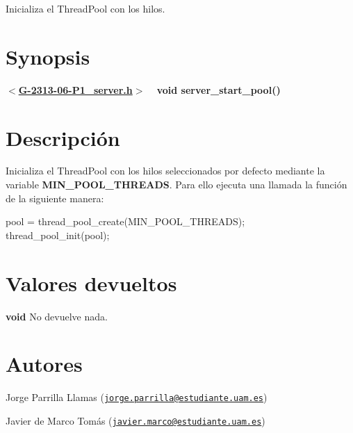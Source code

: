 Inicializa el Thread\+Pool con los hilos.\hypertarget{server_start_pool_Synopsis}{}\section{Synopsis}\label{server_start_pool_Synopsis}
{ {\bfseries $<$\hyperlink{G-2313-06-P1__server_8h_source}{G-\/2313-\/06-\/\+P1\+\_\+server.\+h}$>$} ~\newline
 {\bfseries void server\+\_\+start\+\_\+pool()} } \hypertarget{server_start_pool_descripcion}{}\section{Descripción}\label{server_start_pool_descripcion}
Inicializa el Thread\+Pool con los hilos seleccionados por defecto mediante la variable {\bfseries M\+I\+N\+\_\+\+P\+O\+O\+L\+\_\+\+T\+H\+R\+E\+A\+D\+S}. Para ello ejecuta una llamada la función de la siguiente manera\+:

{\ttfamily  pool = thread\+\_\+pool\+\_\+create(\+M\+I\+N\+\_\+\+P\+O\+O\+L\+\_\+\+T\+H\+R\+E\+A\+D\+S); ~\newline
thread\+\_\+pool\+\_\+init(pool); } \hypertarget{server_start_pool_return}{}\section{Valores devueltos}\label{server_start_pool_return}

\begin{DoxyItemize}
\item {\bfseries void} No devuelve nada. 
\end{DoxyItemize}\hypertarget{server_start_pool_authors}{}\section{Autores}\label{server_start_pool_authors}

\begin{DoxyItemize}
\item Jorge Parrilla Llamas (\href{mailto:jorge.parrilla@estudiante.uam.es}{\tt jorge.\+parrilla@estudiante.\+uam.\+es}) 
\item Javier de Marco Tomás (\href{mailto:javier.marco@estudiante.uam.es}{\tt javier.\+marco@estudiante.\+uam.\+es}) 
\end{DoxyItemize}